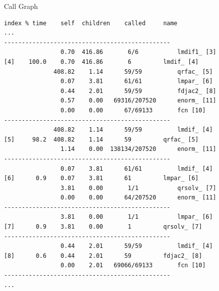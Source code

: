 \documentclass[xcolor={x11names,svgnames}]{beamer}
\begin{document}
\begin{frame}[fragile=singleslide]

  \begin{block}{Call Graph}
  \tiny
\begin{verbatim}
index % time    self  children    called     name
...
-----------------------------------------------
                0.70  416.86       6/6           lmdif1_ [3]
[4]    100.0    0.70  416.86       6         lmdif_ [4]
              408.82    1.14      59/59          qrfac_ [5]
                0.07    3.81      61/61          lmpar_ [6]
                0.44    2.01      59/59          fdjac2_ [8]
                0.57    0.00   69316/207520      enorm_ [11]
                0.00    0.00      67/69133       fcn [10]
-----------------------------------------------
              408.82    1.14      59/59          lmdif_ [4]
[5]     98.2  408.82    1.14      59         qrfac_ [5]
                1.14    0.00  138134/207520      enorm_ [11]
-----------------------------------------------
                0.07    3.81      61/61          lmdif_ [4]
[6]      0.9    0.07    3.81      61         lmpar_ [6]
                3.81    0.00       1/1           qrsolv_ [7]
                0.00    0.00      64/207520      enorm_ [11]
-----------------------------------------------
                3.81    0.00       1/1           lmpar_ [6]
[7]      0.9    3.81    0.00       1         qrsolv_ [7]
-----------------------------------------------
                0.44    2.01      59/59          lmdif_ [4]
[8]      0.6    0.44    2.01      59         fdjac2_ [8]
                0.00    2.01   69066/69133       fcn [10]
-----------------------------------------------
...
\end{verbatim}
\end{block}
\end{frame}


\begin{frame}
\end{frame}
\end{document}
